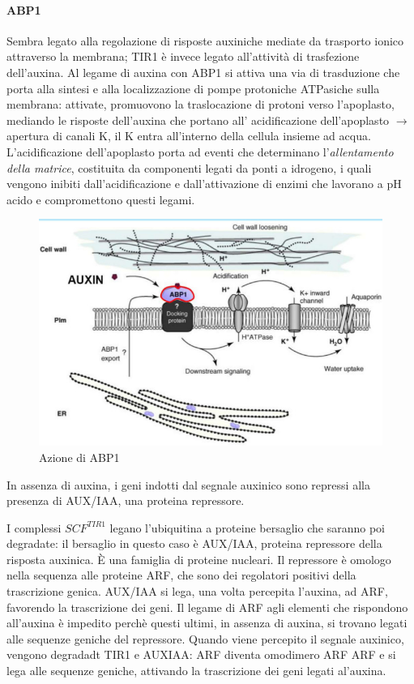 \documentclass[a4paper,12pt]{book}
\newcommand{\lfreccia}{\ensuremath{\longrightarrow}}
\begin{document}
\paragraph{ABP1}
Sembra legato alla regolazione di risposte auxiniche mediate da trasporto ionico attraverso la membrana; TIR1 è invece legato all'attività di trasfezione dell'auxina. Al legame di auxina con ABP1 si attiva una via di trasduzione che porta alla sintesi e alla localizzazione di pompe protoniche ATPasiche sulla membrana: attivate, promuovono la traslocazione di protoni verso l'apoplasto, mediando le risposte dell'auxina che portano all' acidificazione dell'apoplasto \lfreccia apertura di canali K, il K entra all'interno della cellula insieme ad acqua. L'acidificazione dell'apoplasto porta ad eventi che determinano l'\emph{allentamento della matrice}, costituita da componenti legati da ponti a idrogeno, i quali vengono inibiti dall'acidificazione e dall'attivazione di enzimi che lavorano a pH acido e compromettono questi legami.
\begin{figure}[H]
\centering
\includegraphics[scale=0.4]{immagini/aux.jpg}
\caption{Azione di ABP1}
\end{figure}

In assenza di auxina, i geni indotti dal segnale auxinico sono repressi alla presenza di AUX/IAA, una proteina repressore.

I complessi $SCF^{TIR1}$ legano l'ubiquitina a proteine bersaglio  che saranno poi degradate: il bersaglio in questo caso è AUX/IAA, proteina repressore della risposta auxinica. È una famiglia di proteine nucleari. Il repressore è omologo nella sequenza alle proteine ARF, che sono dei regolatori positivi della trascrizione genica. AUX/IAA si lega, una volta percepita l'auxina, ad ARF, favorendo la trascrizione dei geni. Il legame di ARF agli elementi che rispondono all'auxina è impedito perchè questi ultimi, in assenza di auxina, si trovano legati alle sequenze geniche del repressore. Quando viene  percepito il segnale auxinico, vengono degradadt TIR1 e AUXIAA: ARF diventa omodimero ARF ARF e si lega alle sequenze geniche, attivando la trascrizione dei geni legati al'auxina.
\end{document}
